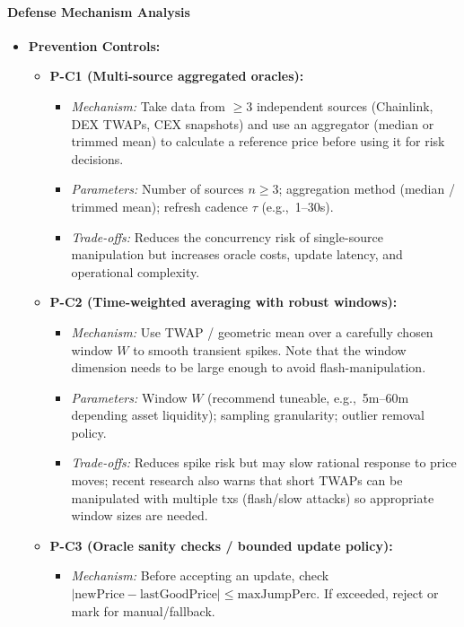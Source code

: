 \paragraph{Defense Mechanism Analysis}
\begin{itemize}
    \item \textbf{Prevention Controls:}
        \begin{itemize}
            \item \textbf{P-C1 (Multi-source aggregated oracles):}
                \begin{itemize}
                    \item \textit{Mechanism:} Take data from $\geq 3$ independent sources (Chainlink, DEX TWAPs, CEX snapshots) and use an aggregator (median or trimmed mean) to calculate a reference price before using it for risk decisions.
                    \item \textit{Parameters:} Number of sources $n \geq 3$; aggregation method (median / trimmed mean); refresh cadence $\tau$ (e.g.,\ 1--30s).
                    \item \textit{Trade-offs:} Reduces the concurrency risk of single-source manipulation but increases oracle costs, update latency, and operational complexity.
                \end{itemize}
            \item \textbf{P-C2 (Time-weighted averaging with robust windows):}
                \begin{itemize}
                    \item \textit{Mechanism:} Use TWAP / geometric mean over a carefully chosen window $W$ to smooth transient spikes. Note that the window dimension needs to be large enough to avoid flash-manipulation.
                    \item \textit{Parameters:} Window $W$ (recommend tuneable, e.g.,\ 5m--60m depending asset liquidity); sampling granularity; outlier removal policy.
                    \item \textit{Trade-offs:} Reduces spike risk but may slow rational response to price moves; recent research also warns that short TWAPs can be manipulated with multiple txs (flash/slow attacks) so appropriate window sizes are needed.
                \end{itemize}
            \item \textbf{P-C3 (Oracle sanity checks / bounded update policy):}
                \begin{itemize}
                    \item \textit{Mechanism:} Before accepting an update, check $|\text{newPrice} - \text{lastGoodPrice}| \leq \text{maxJumpPerc}$. If exceeded, reject or mark for manual/fallback.

\end{itemize}
\end{itemize}
\end{itemize}

